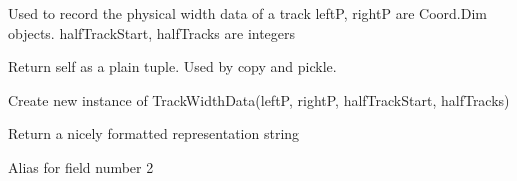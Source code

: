 \documentclass[letterpaper,10pt,english]{sphinxmanual}
\begin{document}
\begin{fulllineitems}
\label{\detokenize{ref/util/plot/PRESCfg:TotalDepth.util.plot.PRESCfg.TrackWidthData}}
Used to record the physical width data of a track
leftP, rightP are Coord.Dim objects.
halfTrackStart, halfTracks are integers

\begin{fulllineitems}
\label{\detokenize{ref/util/plot/PRESCfg:TotalDepth.util.plot.PRESCfg.TrackWidthData.__getnewargs__}}
Return self as a plain tuple.  Used by copy and pickle.

\end{fulllineitems}


\begin{fulllineitems}
\label{\detokenize{ref/util/plot/PRESCfg:TotalDepth.util.plot.PRESCfg.TrackWidthData.__new__}}
Create new instance of TrackWidthData(leftP, rightP, halfTrackStart, halfTracks)

\end{fulllineitems}


\begin{fulllineitems}
\label{\detokenize{ref/util/plot/PRESCfg:TotalDepth.util.plot.PRESCfg.TrackWidthData.__repr__}}
Return a nicely formatted representation string

\end{fulllineitems}


\begin{fulllineitems}
\label{\detokenize{ref/util/plot/PRESCfg:TotalDepth.util.plot.PRESCfg.TrackWidthData.halfTrackStart}}
Alias for field number 2


\end{fulllineitems}
\end{fulllineitems}
\end{document}
